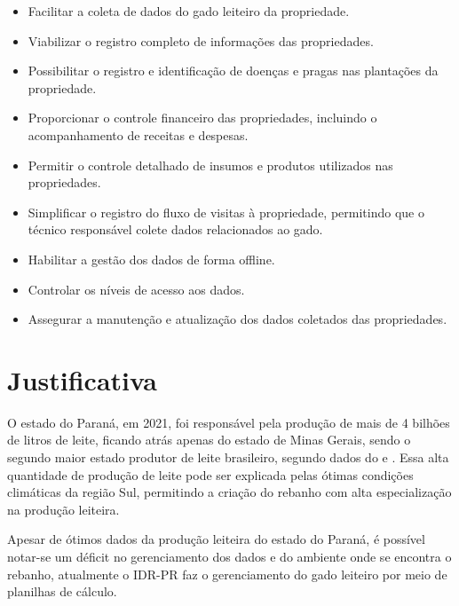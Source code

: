 \begin{itemize}
  \item Facilitar a coleta de dados do gado leiteiro da propriedade.

  \item Viabilizar o registro completo de informações das propriedades.

  \item Possibilitar o registro e identificação de doenças e pragas nas plantações da propriedade.

  \item Proporcionar o controle financeiro das propriedades, incluindo o acompanhamento de receitas e despesas.

  \item Permitir o controle detalhado de insumos e produtos utilizados nas propriedades.

  \item Simplificar o registro do fluxo de visitas à propriedade, permitindo que o técnico responsável colete dados relacionados ao gado.

  \item Habilitar a gestão dos dados de forma offline.

  \item Controlar os níveis de acesso aos dados.

  \item Assegurar a manutenção e atualização dos dados coletados das propriedades.
\end{itemize}

\section{Justificativa}\label{sec:justificativa}

O estado do Paraná, em 2021, foi responsável pela produção de mais de 4 bilhões de litros de leite, ficando atrás apenas do estado de Minas Gerais, sendo o segundo maior estado produtor de leite brasileiro, segundo dados do  e . Essa alta quantidade de produção de leite pode ser explicada pelas ótimas condições climáticas da região Sul, permitindo a criação do rebanho com alta especialização na produção leiteira.

Apesar de ótimos dados da produção leiteira do estado do Paraná, é possível notar-se um déficit no gerenciamento dos dados e do ambiente onde se encontra o rebanho, atualmente o \gls{IDR-PR} faz o gerenciamento do gado leiteiro por meio de planilhas de cálculo.

